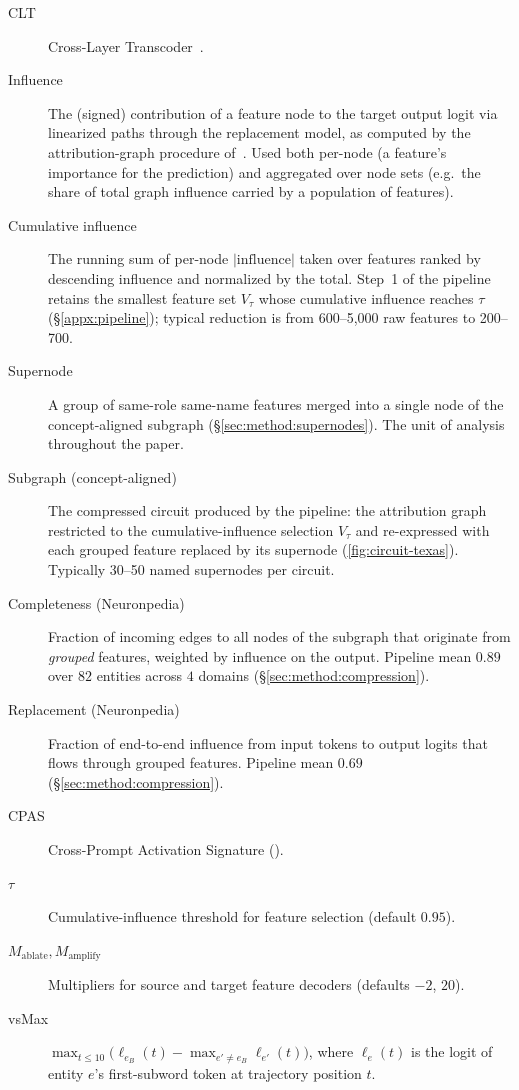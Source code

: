 \begin{description}
\item[CLT] Cross-Layer Transcoder~\cite{ameisen2025circuittracing}.
\item[Influence] The (signed) contribution of a feature node to the target output logit via linearized paths through the replacement model, as computed by the attribution-graph procedure of~\cite{ameisen2025circuittracing}. Used both per-node (a feature's importance for the prediction) and aggregated over node sets (e.g.\ the share of total graph influence carried by a population of features).
\item[Cumulative influence] The running sum of per-node $|\text{influence}|$ taken over features ranked by descending influence and normalized by the total. Step~1 of the pipeline retains the smallest feature set $V_\tau$ whose cumulative influence reaches $\tau$ (\S\ref{appx:pipeline}); typical reduction is from 600--5{,}000 raw features to 200--700.
\item[Supernode] A group of same-role same-name features merged into a single node of the concept-aligned subgraph (\S\ref{sec:method:supernodes}). The unit of analysis throughout the paper.
\item[Subgraph (concept-aligned)] The compressed circuit produced by the pipeline: the attribution graph restricted to the cumulative-influence selection $V_\tau$ and re-expressed with each grouped feature replaced by its supernode (\cref{fig:circuit-texas}). Typically 30--50 named supernodes per circuit.
\item[Completeness (Neuronpedia)] Fraction of incoming edges to all nodes of the subgraph that originate from \emph{grouped} features, weighted by influence on the output. Pipeline mean $0.89$ over $82$ entities across $4$ domains (\S\ref{sec:method:compression}).
\item[Replacement (Neuronpedia)] Fraction of end-to-end influence from input tokens to output logits that flows through grouped features. Pipeline mean $0.69$ (\S\ref{sec:method:compression}).
\item[CPAS] Cross-Prompt Activation Signature ().
\item[$\tau$] Cumulative-influence threshold for feature selection (default $0.95$).
\item[$M_{\mathrm{ablate}}, M_{\mathrm{amplify}}$] Multipliers for source and target feature decoders (defaults $-2$, $20$).
\item[vsMax] $\max_{t \leq 10}\big(\ell_{e_B}(t) - \max_{e' \neq e_B} \ell_{e'}(t)\big)$, where $\ell_e(t)$ is the logit of entity $e$'s first-subword token at trajectory position $t$.

\end{description}
